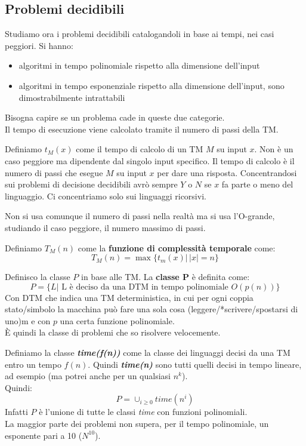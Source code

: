 \subsection{Problemi decidibili}
Studiamo ora i problemi decidibili catalogandoli in base ai tempi, nei casi
peggiori. Si hanno: 
\begin{itemize}
  \item algoritmi in tempo polinomiale rispetto alla dimensione dell'input
  \item algoritmi in tempo esponenziale rispetto alla dimensione dell'input,
  sono dimostrabilmente intrattabili
\end{itemize}
Bisogna capire se un problema cade in queste due categorie.\\
Il tempo di esecuzione viene calcolato tramite il numero di passi della TM.
\begin{definizione}
  Definiamo $t_M(x)$ come il tempo di calcolo di un TM $M$ su input $x$. Non è
  un caso peggiore ma dipendente dal singolo input specifico. Il tempo di
  calcolo è il numero di passi che esegue $M$ su input $x$ per dare una
  risposta. Concentrandosi sui problemi di decisione decidibili avrò sempre $Y$
  o $N$ se $x$ fa parte o meno del linguaggio. Ci concentriamo solo sui
  linguaggi ricorsivi.
\end{definizione}
Non si usa comunque il numero di passi nella realtà ma si usa l'O-grande,
studiando il caso peggiore, il numero massimo di passi.
\begin{definizione}
  Definiamo $T_M(n)$ come la \textbf{funzione di complessità temporale} come:
  \[T_M(n)=\max\{t_m(x)|\,|x|=n\}\]
\end{definizione}
\begin{definizione}
  Definisco la classe $P$ in base alle TM. La \textbf{classe P} è definita come:
  \[P=\{L|\mbox{ L è deciso da una DTM in tempo polinomiale } O(p(n))\}\]
  Con DTM che indica una TM deterministica, in cui per ogni coppia stato/simbolo
  la macchina può fare una sola cosa (leggere/*scrivere/spostarsi di uno)m e con
  $p$ una certa funzione polinomiale.\\
  È quindi la classe di problemi che so risolvere velocemente.
\end{definizione}
\begin{definizione}
  Definiamo la classe \textbf{\textit{time(f(n))}} come la classe dei linguaggi
  decisi da una TM entro un tempo $f(n)$. Quindi \textbf{\textit{time(n)}} sono
  tutti quelli decisi in tempo lineare, ad esempio (ma potrei anche per un
  qualsiasi $n^k$).\\
  Quindi:
  \[P=\cup_{i\geq 0} time(n^i)\]
  Infatti $P$ è l'unione di tutte le classi \textit{time} con funzioni
  polinomiali. \\
  La maggior parte dei problemi non supera, per il tempo polinomiale, un
  esponente pari a 10 ($N^{10}$).
\end{definizione}
